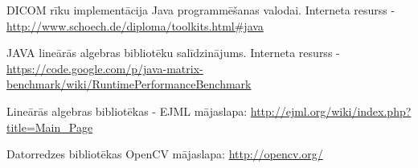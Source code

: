 \begin{thebibliography}{9}
DICOM rīku implementācija Java programmēšanas valodai. Interneta resurss - \url{http://www.schoech.de/diploma/toolkits.html#java}

JAVA lineārās algebras bibliotēku salīdzinājums. Interneta resurss - \url{https://code.google.com/p/java-matrix-benchmark/wiki/RuntimePerformanceBenchmark}

Lineārās algebras bibliotēkas - EJML mājaslapa: \url{http://ejml.org/wiki/index.php?title=Main_Page}

Datorredzes bibliotēkas OpenCV mājaslapa: \url{http://opencv.org/}
\end{thebibliography}